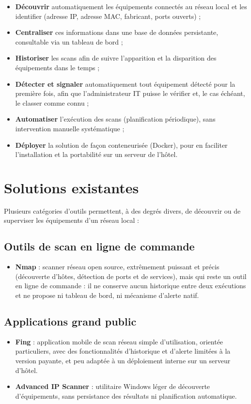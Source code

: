 \begin{itemize}
    \item \textbf{Découvrir} automatiquement les équipements connectés au réseau local
    et les identifier (adresse IP, adresse MAC, fabricant, ports ouverts) ;
    \item \textbf{Centraliser} ces informations dans une base de données persistante,
    consultable via un tableau de bord ;
    \item \textbf{Historiser} les scans afin de suivre l'apparition et la disparition des
    équipements dans le temps ;
    \item \textbf{Détecter et signaler} automatiquement tout équipement détecté pour la
    première fois, afin que l'administrateur IT puisse le vérifier et, le cas échéant, le
    classer comme connu ;
    \item \textbf{Automatiser} l'exécution des scans (planification périodique), sans
    intervention manuelle systématique ;
    \item \textbf{Déployer} la solution de façon conteneurisée (Docker), pour en
    faciliter l'installation et la portabilité sur un serveur de l'hôtel.
\end{itemize}

\section{Solutions existantes}

Plusieurs catégories d'outils permettent, à des degrés divers, de découvrir ou de
superviser les équipements d'un réseau local :

\subsection{Outils de scan en ligne de commande}
\begin{itemize}
    \item \textbf{Nmap} : scanner réseau open source, extrêmement puissant et précis
    (découverte d'hôtes, détection de ports et de services), mais qui reste un outil en
    ligne de commande : il ne conserve aucun historique entre deux exécutions et ne
    propose ni tableau de bord, ni mécanisme d'alerte natif.
\end{itemize}

\subsection{Applications grand public}
\begin{itemize}
    \item \textbf{Fing} : application mobile de scan réseau simple d'utilisation,
    orientée particuliers, avec des fonctionnalités d'historique et d'alerte limitées à
    la version payante, et peu adaptée à un déploiement interne sur un serveur d'hôtel.
    \item \textbf{Advanced IP Scanner} : utilitaire Windows léger de découverte
    d'équipements, sans persistance des résultats ni planification automatique.
\end{itemize}

